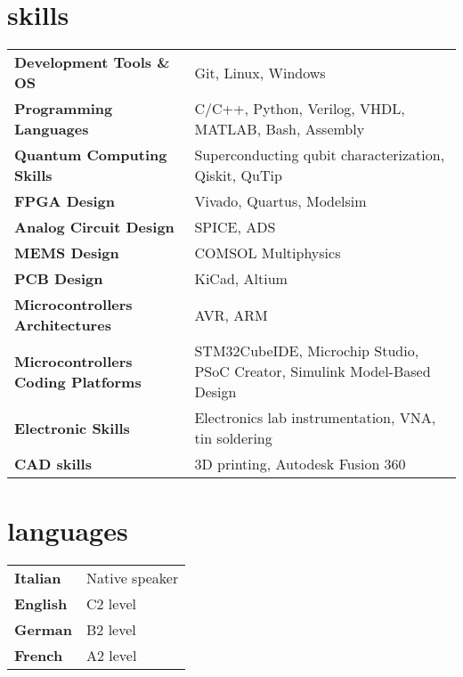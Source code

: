 \documentclass[10pt]{article}
\begin{document}
\section{skills}
\begin{tabular}{l l}
    \textbf{Development Tools \& OS}& Git, Linux, Windows\\
    \textbf{Programming Languages}& C/C++, Python, Verilog, VHDL, MATLAB, Bash, Assembly\\
    \textbf{Quantum Computing Skills}& Superconducting qubit characterization, Qiskit, QuTip\\
    \textbf{FPGA Design}& Vivado, Quartus, Modelsim\\
    \textbf{Analog Circuit Design}& SPICE, ADS\\
    \textbf{MEMS Design}& COMSOL Multiphysics\\
    \textbf{PCB Design}& KiCad, Altium\\
    \textbf{Microcontrollers Architectures}& AVR, ARM\\
    \textbf{Microcontrollers Coding Platforms}& STM32CubeIDE, Microchip Studio, PSoC Creator, Simulink Model-Based Design\\
    \textbf{Electronic Skills}& Electronics lab instrumentation, VNA, tin soldering\\
    \textbf{CAD skills}& 3D printing, Autodesk Fusion 360
\end{tabular}

\section{languages}
\begin{tabular}{l l}
    \textbf{Italian}& Native speaker\\
    \textbf{English}& C2 level\\
    \textbf{German}& B2 level\\
    \textbf{French}& A2 level
\end{tabular}
\end{document}
